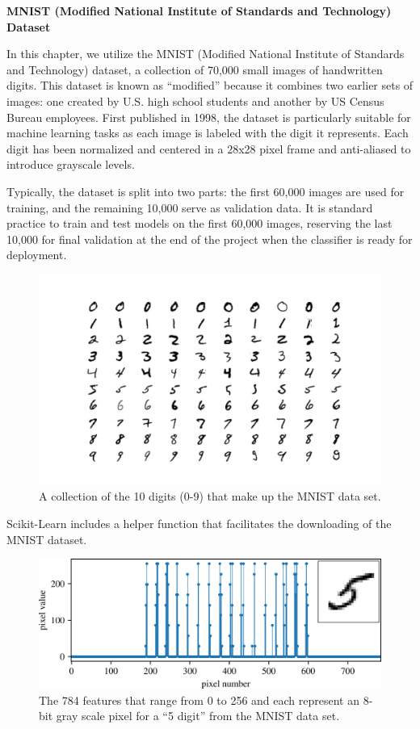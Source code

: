 \documentclass[12pt,letter]{article}
\begin{document}
\begin{data}
\textbf{MNIST (Modified National Institute of Standards and Technology) Dataset}

\noindent  In this chapter, we utilize the MNIST (Modified National Institute of Standards and Technology) dataset, a collection of 70,000 small images of handwritten digits. This dataset is known as ``modified'' because it combines two earlier sets of images: one created by U.S. high school students and another by US Census Bureau employees. First published in 1998, the dataset is particularly suitable for machine learning tasks as each image is labeled with the digit it represents. Each digit has been normalized and centered in a 28x28 pixel frame and anti-aliased to introduce grayscale levels.

Typically, the dataset is split into two parts: the first 60,000 images are used for training, and the remaining 10,000 serve as validation data. It is standard practice to train and test models on the first 60,000 images, reserving the last 10,000 for final validation at the end of the project when the classifier is ready for deployment.

\begin{figure}[H]
    \centering
    \includegraphics[width=6.0in]{../figures/MNIST_data_set}
    \caption{A collection of the 10 digits (0-9) that make up the MNIST data set.}
    \label{fig:MNIST_data_set}
\end{figure}

Scikit-Learn includes a helper function that facilitates the downloading of the MNIST dataset.


\begin{figure}[H]
	\centering
	\includegraphics[width=6.0in]{../figures/MNIST_digit_features}
	\caption{The 784 features that range from 0 to 256 and each represent an 8-bit gray scale pixel for a ``5 digit'' from the MNIST data set.}
	\label{fig:MNIST_digit_features}
\end{figure}



\end{data}
\end{document}
